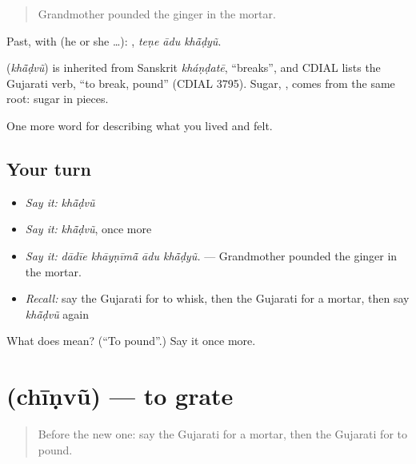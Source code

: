 \begin{quote}
Grandmother pounded the ginger in the mortar.
\end{quote}

Past, with  (he or she …):   , \emph{teṇe ādu khā̃ḍyũ}.

\begin{cousinweb}
\textbf{} (\emph{khā̃ḍvũ}) is inherited from Sanskrit \emph{kháṇḍatē}, \textquotedblleft{}breaks\textquotedblright{}, and CDIAL lists the Gujarati verb, \textquotedblleft{}to break, pound\textquotedblright{} (CDIAL 3795). Sugar, \textbf{}, comes from the same root: sugar in pieces.
\end{cousinweb}

\begin{grammarlens}[title={What you've built}]
One more word for describing what you lived and felt.
\end{grammarlens}

\subsection*{Your turn}
\begin{itemize}
\raggedright
  \item \emph{Say it:} \emph{khā̃ḍvũ}
  \item \emph{Say it:} \emph{khā̃ḍvũ}, once more
  \item \emph{Say it:} \emph{dādīe khāyṇīmā̃ ādu khā̃ḍyũ.} — Grandmother pounded the ginger in the mortar.
  \item \emph{Recall:} say the Gujarati for to whisk, then the Gujarati for a mortar, then say \emph{khā̃ḍvũ} again
\end{itemize}

\begin{tcolorbox}[breakable,colback=teal!4,colframe=teal!35!black,title={Before you move on}]
What does  mean? (\textquotedblleft{}To pound\textquotedblright{}.) Say it once more.
\end{tcolorbox}
\section[\texorpdfstring{\gu{છીણવું} (chīṇvũ)}{છીણવું (chīṇvũ)}]{ (chīṇvũ) — to grate}

\label{lesson:GU-C522-chinvu}



\begin{quote}
Before the new one: say the Gujarati for a mortar, then the Gujarati for to pound.
\end{quote}

